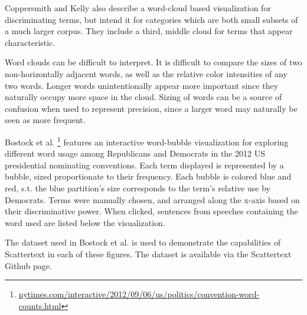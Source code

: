 \documentclass[11pt,a4paper]{article}
\begin{document}
Coppersmith and Kelly  also describe a word-cloud based visualization for discriminating terms, but intend it for categories which are both small subsets of a much larger corpus. They include a third, middle cloud for terms that appear characteristic.  

Word clouds can be difficult to interpret.  It is difficult to compare the sizes of two non-horizontally adjacent words,  as well as the relative color intensities of any two words. Longer words unintentionally appear more important since they naturally occupy more space in the cloud.  Sizing of words can be a source of confusion when used to represent precision, since a larger word may naturally be seen as more frequent.

Bostock et al. \footnote{\href{http://www.nytimes.com/interactive/2012/09/06/us/politics/convention-word-counts.html}{nytimes.com/interactive/2012/09/06/us/politics/convention-word-counts.html}} features an interactive word-bubble visualization for exploring different word usage among Republicans and Democrats in the 2012 US presidential nominating conventions.  Each term displayed is represented by a bubble, sized proportionate to their frequency.  Each bubble is colored blue and red, s.t. the blue partition's size corresponds to the term's relative use by Democrats.  Terms were manually chosen, and arranged along the x-axis based on their discriminative power. When clicked, sentences from speeches containing the word used are listed below the visualization. 

The dataset used in Bostock et al.  is used to demonstrate the capabilities of Scattertext in each of these figures.  The dataset is available via the Scattertext Github page.
\end{document}
